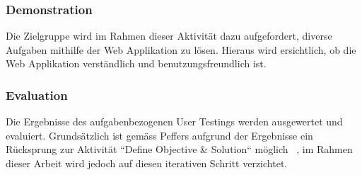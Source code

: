 \subsubsection{Demonstration}
Die Zielgruppe wird im Rahmen dieser Aktivität dazu aufgefordert, diverse Aufgaben mithilfe der Web Applikation zu lösen. Hieraus wird ersichtlich, ob die Web Applikation verständlich und benutzungsfreundlich ist.

\subsubsection{Evaluation}
Die Ergebnisse des aufgabenbezogenen User Testings werden ausgewertet und evaluiert. Grundsätzlich ist gemäss Peffers aufgrund der Ergebnisse ein Rücksprung zur Aktivität ``Define Objective \& Solution`` möglich ~\citep[S. 56]{peffers}, im Rahmen dieser Arbeit wird jedoch auf diesen iterativen Schritt verzichtet.